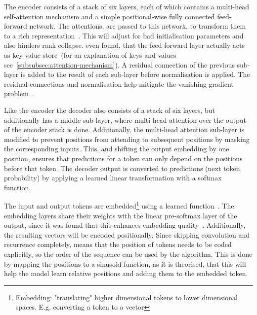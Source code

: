 The encoder consists of a stack of six layers, each of which contains a multi-head self-attention mechanism and a simple positional-wise fully connected feed-forward network.
The attentions, are passed to this network, to transform them to a rich representation~\autocite{Vaswani2017}.
This will adjust for bad initialisation parameters and also hinders rank collapse. %
\citeauthor{Geva2021} even found, that the feed forward layer actually acts as key value store~\autocite{Geva2021}(for an explanation of keys and values see~\autoref{subsubsec:attention-mechanism}).
A residual connection of the previous sub-layer is added to the result of each sub-layer before normalisation is applied.
The residual connections and normalisation help mitigate the vanishing gradient problem~\autocite{Wang2019}. %

Like the encoder the decoder also consists of a stack of six layers, but additionally has a middle sub-layer, where multi-head-attention over the output of the encoder stack is done.
Additionally, the multi-head attention sub-layer is modified to prevent positions from attending to subsequent positions by masking the corresponding inputs.
This, and shifting the output embedding by one position, ensures that predictions for a token can only depend on the positions before that token.
The decoder output is converted to predictions (next token probability) by applying a learned linear transformation with a softmax function.~\autocite{Vaswani2017}

The input and output tokens are embedded\footnote{Embedding: "translating" higher dimensional tokens to lower dimensional spaces. E.g. converting a token to a vector} using a learned function~\autocite{Vaswani2017}.
The embedding layers share their weights with the linear pre-softmax layer of the output, since it was found that this enhances embedding quality~\autocite{Press2017}.
Additionally, the resulting vectors will be encoded positionally.
Since skipping convolution and recurrence completely, means that the position of tokens needs to be coded explicitly, so the order of the sequence can be used by the algorithm.
This is done by mapping the positions to a sinusoid function, as it is theorised, that this will help the model learn relative positions and adding them to the embedded token.~\autocite{Vaswani2017}


